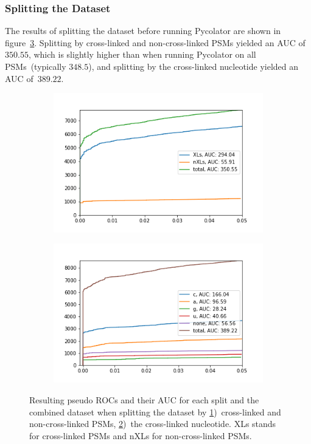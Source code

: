 \subsubsection{Splitting the Dataset}
\label{lab:results:splitting}
The results of splitting the dataset before running Pycolator are shown in figure~\ref{fig:results:splitting}. Splitting by cross-linked and non-cross-linked PSMs yielded an AUC of~$350.55$, which is slightly higher than when running Pycolator on all PSMs~(typically $348.5$), and splitting by the cross-linked nucleotide yielded an AUC of~$389.22$.
\renewcommand{\baselinestretch}{0.9}
\begin{figure}
	\normalsize
	\centering
	\begin{subfigure}{0.49 \textwidth}
		\includegraphics[width = \textwidth]{figures/split_by_xl.png}
		\caption{}
		\label{fig:results:splitting_xl}
	\end{subfigure}
	\hfill
	\begin{subfigure}{0.49 \textwidth}
		\includegraphics[width = \textwidth]{figures/split_by_bases.png}
		\caption{}
		\label{fig:results:splitting_bases}
	\end{subfigure}
	\caption[Results of splitting the dataset]{Resulting pseudo ROCs and their AUC for each split and the combined dataset when splitting the dataset by \ref{fig:results:splitting_xl})~cross-linked and non-cross-linked PSMs, \ref{fig:results:splitting_bases})~the cross-linked nucleotide. XLs stands for cross-linked PSMs and nXLs for non-cross-linked PSMs.}
	\label{fig:results:splitting}
\end{figure}
\renewcommand{\baselinestretch}{1}

